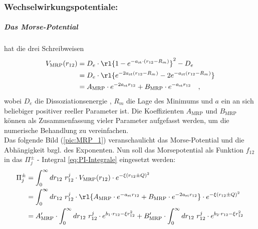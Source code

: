 \subsubsection{Wechselwirkungspotentiale:}
\subparagraph{Das Morse-Potential} hat die drei Schreibweisen  
%
\begin{align}\label{eq:MRP}
V_{\text{MRP}}(r_{12}) &= D_e\cdot \rl{1-e^{-a_\text{st}\cdot(r_{12}-R_m)}}^2 
-D_e\\
                       &= D_e\cdot 
                       \rl{e^{-2a_\text{st}(r_{12}-R_m)}-2e^{-a_\text{st}(r_{12}-R_m)}}\\
                       &=A_{\text{MRP}}\cdot e^{-2a_\text{st} r_{12}} + 
                       B_{\text{MRP}}\cdot e^{-a_\text{st} r_{12}} \quad,
\end{align}
%
wobei $D_e$ die Dissoziationsenergie , $R_m$ die Lage des Minimums und $a$ ein 
an sich beliebiger positiver reeller Parameter ist.  Die Koeffizienten 
$A_\text{MRP} \text{ und  }B_\text{MRP}$ können als Zusammenfassung vieler 
Parameter 
aufgefasst werden, um die numerische Behandlung zu vereinfachen. \\
Das folgende Bild (\ref{pic:MRP_1}) veranschaulicht das Morse-Potential und die 
Abhängigkeit 
bzgl. des Exponenten.
%
%
Nun soll das Morsepotential als Funktion $f_{12}$ in das $\Pi^\pm_j$ - 
Integral  \ref{eq:PI-Integrale} eingesetzt werden:
%
\begin{align}
\Pi_j^\pm & =\int_{0}^{\infty}dr_{12}\ r_{12}^j \cdot V_\text{MRP}(r_{12}) \cdot
           e^{-\xi (r_{12} \pm Q)^2}\\
          & = \int_{0}^{\infty}dr_{12}\ r_{12}^j \cdot \rl{A_{\text{MRP}}\cdot 
          e^{-a_\text{st} r_{12}} + B_{\text{MRP}}\cdot e^{-2a_\text{st} 
          r_{12}}} \cdot e^{-\xi 
          (r_{12} \pm Q)^2} \\ \label{eq:PI_MRP}
          & = A^\prime_{\text{MRP}}\cdot \int_{0}^{\infty}dr_{12}\ r_{12}^j 
          \cdot e^{b_1\cdot r_{12} - \xi r_{12}^2} + B^\prime_\text{MRP}\cdot 
          \int_{0}^{\infty}dr_{12}\ r_{12}^j \cdot e^{b_2\cdot r_{12} - \xi 
          r_{12}^2}
\end{align}
